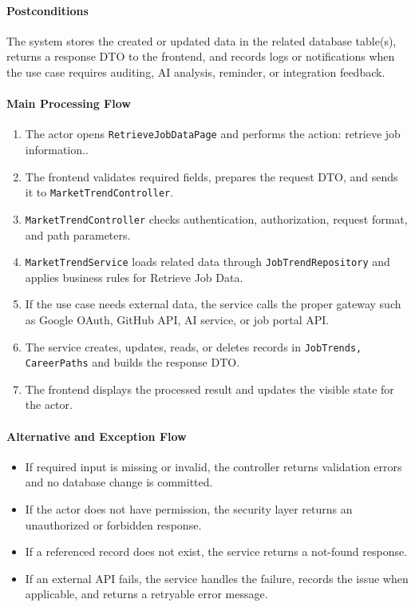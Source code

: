 \paragraph{Postconditions}

The system stores the created or updated data in the related database table(s), returns a response DTO to the frontend, and records logs or notifications when the use case requires auditing, AI analysis, reminder, or integration feedback.

\paragraph{Main Processing Flow}

\begin{enumerate}
    \item The actor opens \texttt{RetrieveJobDataPage} and performs the action: retrieve job information..
    \item The frontend validates required fields, prepares the request DTO, and sends it to \texttt{MarketTrendController}.
    \item \texttt{MarketTrendController} checks authentication, authorization, request format, and path parameters.
    \item \texttt{MarketTrendService} loads related data through \texttt{JobTrendRepository} and applies business rules for Retrieve Job Data.
    \item If the use case needs external data, the service calls the proper gateway such as Google OAuth, GitHub API, AI service, or job portal API.
    \item The service creates, updates, reads, or deletes records in \texttt{JobTrends, CareerPaths} and builds the response DTO.
    \item The frontend displays the processed result and updates the visible state for the actor.
\end{enumerate}

\paragraph{Alternative and Exception Flow}

\begin{itemize}
    \item If required input is missing or invalid, the controller returns validation errors and no database change is committed.
    \item If the actor does not have permission, the security layer returns an unauthorized or forbidden response.
    \item If a referenced record does not exist, the service returns a not-found response.
    \item If an external API fails, the service handles the failure, records the issue when applicable, and returns a retryable error message.
\end{itemize}

